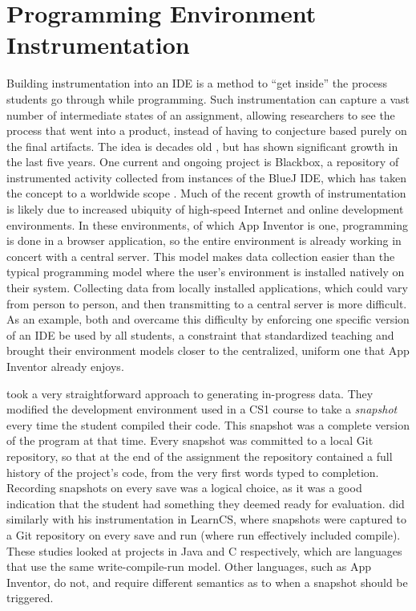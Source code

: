 \section{Programming Environment Instrumentation}
Building instrumentation into an IDE is a method to ``get inside'' the process students go through while programming. Such instrumentation can capture a vast number of intermediate states of an assignment, allowing researchers to see the process that went into a product, instead of having to conjecture based purely on the final artifacts. The idea is decades old \citep{spohrer1985goal}, but has shown significant growth in the last five years. One current and ongoing project is Blackbox, a repository of instrumented activity collected from instances of the BlueJ IDE, which has taken the concept to a worldwide scope \citep{brown2014blackbox}. Much of the recent growth of instrumentation is likely due to increased ubiquity of high-speed Internet and online development environments. In these environments, of which App Inventor is one, programming is done in a browser application, so the entire environment is already working in concert with a central server. This model makes data collection easier than the typical programming model where the user's environment is installed natively on their system. Collecting data from locally installed applications, which could vary from person to person, and then transmitting to a central server is more difficult. As an example, both \citet{piech-2012} and \citet{brown2014blackbox} overcame this difficulty by enforcing one specific version of an IDE be used by all students, a constraint that standardized teaching and brought their environment models closer to the centralized, uniform one that App Inventor already enjoys.

\citet{piech-2012} took a very straightforward approach to generating in-progress data. They modified the development environment used in a CS1 course to take a \emph{snapshot} every time the student compiled their code. This snapshot was a complete version of the program at that time. Every snapshot was committed to a local Git repository, so that at the end of the assignment the repository contained a full history of the project's code, from the very first words typed to completion. Recording snapshots on every save was a logical choice, as it was a good indication that the student had something they deemed ready for evaluation. \citet{lipman-phd} did similarly with his instrumentation in LearnCS, where snapshots were captured to a Git repository on every save and run (where run effectively included compile). These studies looked at projects in Java and C respectively, which are languages that use the same write-compile-run model. Other languages, such as App Inventor, do not, and require different semantics as to when a snapshot should be triggered.


